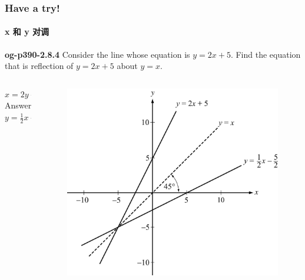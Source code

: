 \documentclass[
	11pt, %
	handout,
]{beamer}
\begin{document}
\begin{frame}
	\frametitle{Have a try!}
	\framesubtitle{x 和 y 对调}
   \textbf{og-p390-2.8.4} Consider the line whose equation is $y = 2x + 5$. Find the equation that is reflection of $y = 2x + 5$ about $y=x$.
	\begin{columns}[t] 
		\begin{column}{0.4\textwidth} %
		\pause
		$x = 2y + 5$\\
		\bigskip
    Answer \textbf{$y  = \frac{1}{2} x - \frac{5}{2}$}
		\end{column}
		\begin{column}{0.6\textwidth} %
		  \begin{figure}
				\includegraphics[width=\linewidth]{Reflection3.jpg} 
			\end{figure}
    \end{column}
	\end{columns}
\end{frame}

\end{document}
